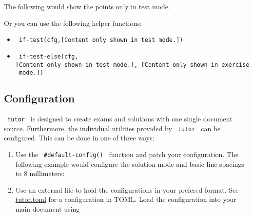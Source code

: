 The following would show the points only in test mode.

\begin{Shaded}
\begin{Highlighting}[]
\NormalTok{\}}
\end{Highlighting}
\end{Shaded}

Or you can use the following helper functions:

\begin{itemize}
\tightlist
\item
  \texttt{\ if-test(cfg,{[}Content\ only\ shown\ in\ test\ mode.{]})\ }
\item
  \texttt{\ if-test-else(cfg,{[}Content\ only\ shown\ in\ test\ mode.{]},\ {[}Content\ only\ shown\ in\ exercise\ mode.{]})\ }
\end{itemize}

\subsection{Configuration}\label{configuration}

\texttt{\ tutor\ } is designed to create exams and solutions with one
single document source. Furthermore, the individual utilities provided
by \texttt{\ tutor\ } can be configured. This can be done in one of
three ways:

\begin{enumerate}
\tightlist
\item
  Use the \texttt{\ \#default-config()\ } function and patch your
  configuration. The following example would configure the solution mode
  and basic line spacings to 8 millimeters:
\end{enumerate}

\begin{Shaded}
\begin{Highlighting}[]
\end{Highlighting}
\end{Shaded}

\begin{enumerate}
\setcounter{enumi}{1}
\tightlist
\item
  Use an external file to hold the configurations in your prefered
  format. See
  \href{https://github.com/rangerjo/tutor/blob/main/example/tutor.toml}{tutor.toml}
  for a configuration in TOML. Load the configuration into your main
  document using
\end{enumerate}

